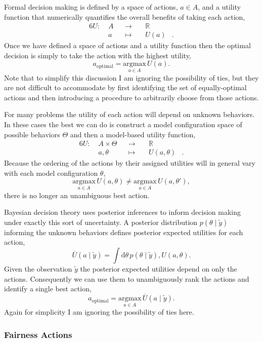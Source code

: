 \documentclass[
  letterpaper,
  DIV=11,
  numbers=noendperiod]{scrartcl}
\begin{document}
Formal decision making is defined by a space of actions, \(a \in A\),
and a utility function that numerically quantifies the overall benefits
of taking each action, \begin{alignat*}{6}
U :\; & A & &\rightarrow& \; & \mathbb{R} &
\\
& a & &\mapsto& & U(a) &.
\end{alignat*} Once we have defined a space of actions and a utility
function then the optimal decision is simply to take the action with the
highest utility, \[
a_{\mathrm{optimal}}
=
\underset{a \in A}{\mathrm{argmax}} \, U(a).
\] Note that to simplify this discussion I am ignoring the possibility
of ties, but they are not difficult to accommodate by first identifying
the set of equally-optimal actions and then introducing a procedure to
arbitrarily choose from those actions.

For many problems the utility of each action will depend on unknown
behaviors. In these cases the best we can do is construct a model
configuration space of possible behaviors \(\Theta\) and then a
model-based utility function, \begin{alignat*}{6}
U :\; & A \times \Theta & &\rightarrow& \; & \mathbb{R} &
\\
& a, \theta & &\mapsto& & U(a, \theta) &.
\end{alignat*} Because the ordering of the actions by their assigned
utilities will in general vary with each model configuration \(\theta\),
\[
\underset{a \in A}{\mathrm{argmax}} \, U(a, \theta)
\ne
\underset{a \in A}{\mathrm{argmax}} \, U(a, \theta'),
\] there is no longer an unambiguous best action.

Bayesian decision theory uses posterior inferences to inform decision
making under exactly this sort of uncertainty. A posterior distribution
\(p(\theta \mid \tilde{y})\) informing the unknown behaviors defines
posterior expected utilities for each action, \[
\overline{U}(a \mid \tilde{y})
=
\int \mathrm{d} \theta \, p(\theta \mid \tilde{y}) , U(a, \theta).
\] Given the observation \(\tilde{y}\) the posterior expected utilities
depend on only the actions. Consequently we can use them to
unambiguously rank the actions and identify a single best action, \[
a_{\mathrm{optimal}}
=
\underset{a \in A}{\mathrm{argmax}} \, \overline{U}(a \mid \tilde{y}).
\] Again for simplicity I am ignoring the possibility of ties here.

\subsubsection{Fairness Actions}\label{sec:actions}
\end{document}
